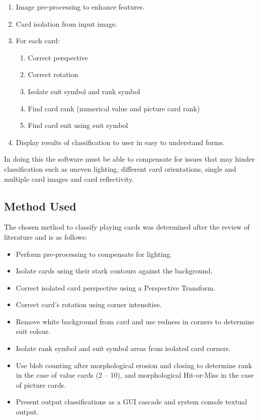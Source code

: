 \documentclass[a4paper,12pt,notitlepage]{article}
\begin{document}
		\begin{enumerate}
			\item Image pre-processing to enhance features.
			\item Card isolation from input image.
			\item For each card:
			\begin{enumerate}
				\item Correct perspective
				\item Correct rotation
				\item Isolate suit symbol and rank symbol
				\item Find card rank (numerical value and picture card rank)
				\item Find card suit using suit symbol
			\end{enumerate}
			\item Display results of classification to user in easy to understand forms.
		\end{enumerate}

		In doing this the software must be able to compensate for issues that may hinder classification such as uneven lighting, different card orientations, single and multiple card images and card reflectivity.
	\subsection{Method Used}
		The chosen method to classify playing cards was determined after the review of literature and is as follows:
		\begin{itemize}
			\item Perform pre-processing to compensate for lighting.
			\item Isolate cards using their stark contours against the background.
			\item Correct isolated card perspective using a Perspective Transform.
			\item Correct card's rotation using corner intensities.
			\item Remove white background from card and use redness in corners to determine suit colour.
			\item Isolate rank symbol and suit symbol areas from isolated card corners.
			\item Use blob counting after morphological erosion and closing to determine rank in the case of value cards (2 -- 10), and morphological Hit-or-Miss in the case of picture cards.
			\item Present output classifications as a GUI cascade and system console textual output.
		\end{itemize}
\end{document}
